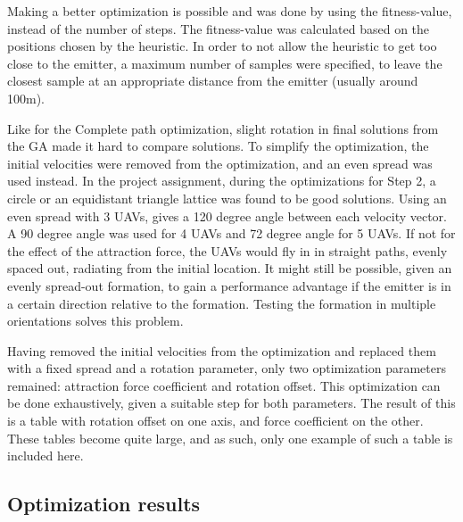 \documentclass[10pt,a4paper]{book}
\begin{document}
Making a better optimization is possible and was done by using the fitness-value, instead of the number of steps. The fitness-value was calculated based on the positions chosen by the heuristic. In order to not allow the heuristic to get too close to the emitter, a maximum number of samples were specified, to leave the closest sample at an appropriate distance from the emitter (usually around 100m). 


Like for the Complete path optimization, slight rotation in final solutions from the \gls{GA} made it hard to compare solutions. To simplify the optimization, the initial velocities were removed from the optimization, and an even spread was used instead. In the project assignment, during the optimizations for Step 2, a circle or an equidistant triangle lattice was found to be good solutions. Using an even spread with 3 \glspl{UAV}, gives a 120 degree angle between each velocity vector. A 90 degree angle was used for 4 \glspl{UAV} and 72 degree angle for 5 \glspl{UAV}. If not for the effect of the attraction force, the \glspl{UAV} would fly in in straight paths, evenly spaced out, radiating from the initial location. It might still be possible, given an evenly spread-out formation, to gain a performance advantage if the emitter is in a certain direction relative to the formation. Testing the formation in multiple orientations solves this problem.

Having removed the initial velocities from the optimization and replaced them with a fixed spread and a rotation parameter, only two optimization parameters remained: attraction force coefficient and rotation offset. This optimization can be done exhaustively, given a suitable step for both parameters. The result of this is a table with rotation offset on one axis, and force coefficient on the other. These tables become quite large, and as such, only one example of such a table is included here.


\subsection{Optimization results}
\end{document}
